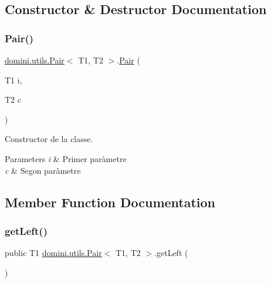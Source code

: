 \subsection{Constructor \& Destructor Documentation}
\mbox{\label{classdomini_1_1utils_1_1Pair_a9db8755d5034cf4f99f9007b9d6fd22d}} 
\subsubsection{\texorpdfstring{Pair()}{Pair()}}
{\footnotesize\ttfamily \hyperlink{classdomini_1_1utils_1_1Pair}{domini.\+utils.\+Pair}$<$ T1, T2 $>$.\hyperlink{classdomini_1_1utils_1_1Pair}{Pair} (\begin{DoxyParamCaption}\item[{T1}]{i,  }\item[{T2}]{c }\end{DoxyParamCaption})\hspace{0.3cm}{\ttfamily [inline]}}



Constructor de la classe. 


\begin{DoxyParams}{Parameters}
{\em i} & Primer paràmetre \\
\hline
{\em c} & Segon paràmetre \\
\hline
\end{DoxyParams}


\subsection{Member Function Documentation}
\mbox{\label{classdomini_1_1utils_1_1Pair_a9439fbd8488cb1fbf00c57f15f093c4b}} 
\subsubsection{\texorpdfstring{get\+Left()}{getLeft()}}
{\footnotesize\ttfamily public T1 \hyperlink{classdomini_1_1utils_1_1Pair}{domini.\+utils.\+Pair}$<$ T1, T2 $>$.get\+Left (\begin{DoxyParamCaption}{ }\end{DoxyParamCaption})\hspace{0.3cm}{\ttfamily [inline]}}

